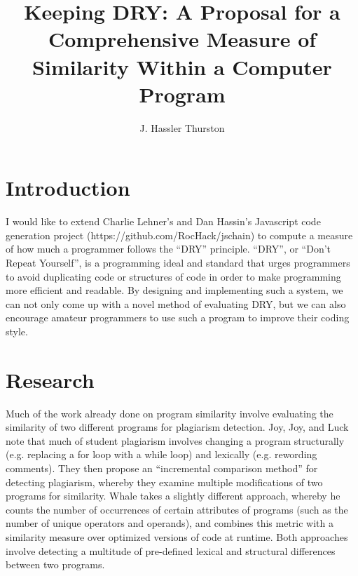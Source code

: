 \documentclass{article}
\title{Keeping DRY: A Proposal for a Comprehensive Measure of Similarity Within a Computer Program}
\author{J. Hassler Thurston}
\date{}
\begin{document}
\maketitle

\section{Introduction} I would like to extend Charlie Lehner's and Dan Hassin's Javascript code generation project (https://github.com/RocHack/jschain)  to compute a measure of how much a programmer follows the ``DRY'' principle. ``DRY'', or ``Don't Repeat Yourself'', is a programming ideal and standard that urges programmers to avoid duplicating code or structures of code in order to make programming more efficient and readable. By designing and implementing such a system, we can not only come up with a novel method of evaluating DRY, but we can also encourage amateur programmers to use such a program to improve their coding style.

\section{Research} Much of the work already done on program similarity involve evaluating the similarity of two different programs for plagiarism detection. Joy, Joy, and Luck \cite{PlagiarismProgrammingAssignments} note that much of student plagiarism involves changing a program structurally (e.g. replacing a for loop with a while loop) and lexically (e.g. rewording comments). They then propose an ``incremental comparison method'' for detecting plagiarism, whereby they examine multiple modifications of two programs for similarity. Whale \cite{ProgramSimilarityPopulations} takes a slightly different approach, whereby he counts the number of occurrences of certain attributes of programs (such as the number of unique operators and operands), and combines this metric with a similarity measure over optimized versions of code at runtime. Both approaches involve detecting a multitude of pre-defined lexical and structural differences between two programs.
\end{document}
